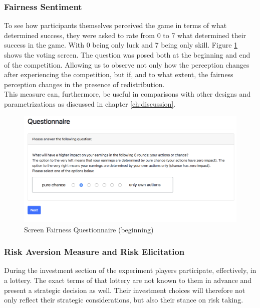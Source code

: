     \subsubsection{Fairness Sentiment}
    
    To see how participants themselves perceived the game in terms of what determined success, they were asked to rate from 0 to 7 what determined their success in the game. With 0 being only luck and 7 being only skill. Figure \ref{fig:fair_q} shows the voting screen. The question was posed both at the beginning and end of the competition. Allowing us to observe not only how the perception changes after experiencing the competition, but if, and to what extent, the fairness perception changes in the presence of redistribution.\\
    
    This measure can, furthermore, be useful in comparisons with other designs and parametrizations as discussed in chapter \ref{ch:discussion}.
    
    \begin{figure}
        \centering
        \includegraphics[width=\textwidth]{graphs/Fairness_Q_Begin.png}
        \caption{Screen Fairness Questionnaire (beginning)}
        \label{fig:fair_q}
    \end{figure}
    
        
    \subsubsection{Risk Aversion Measure and Risk Elicitation}
    
    During the investment section of the experiment players participate, effectively, in a lottery. The exact terms of that lottery are not known to them in advance and present a strategic decision as well. Their investment choices will therefore not only reflect their strategic considerations, but also their stance on risk taking.\\
    
